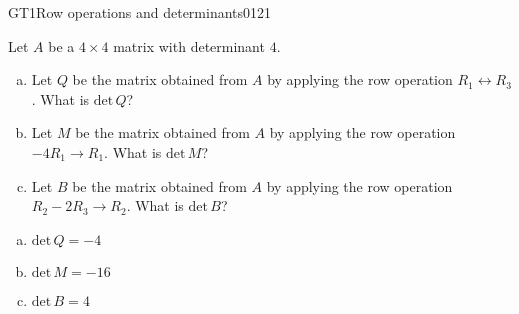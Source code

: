 \begin{exercise}{GT1}{Row operations and determinants}{0121} 
\begin{exerciseStatement} 

Let \(A\) be a \(4 \times 4\) matrix with determinant \(4\).

 

\begin{enumerate}[(a)]
\item Let \(Q\) be the matrix obtained from \(A\) by applying the row operation \(R_1 \leftrightarrow R_3\). What is \(\mathrm{det}\,Q\)?
\item Let \(M\) be the matrix obtained from \(A\) by applying the row operation \(-4 R_1 \to R_1\). What is \(\mathrm{det}\,M\)?
\item Let \(B\) be the matrix obtained from \(A\) by applying the row operation \(R_2 - 2 R_3 \to R_2\). What is \(\mathrm{det}\,B\)?
\end{enumerate}

     \end{exerciseStatement}
 \begin{exerciseAnswer} 

\begin{enumerate}[(a)]
\item \(\mathrm{det}\,Q=-4\)
\item \(\mathrm{det}\,M=-16\)
\item \(\mathrm{det}\,B=4\)
\end{enumerate}

     \end{exerciseAnswer}
 \end{exercise}



